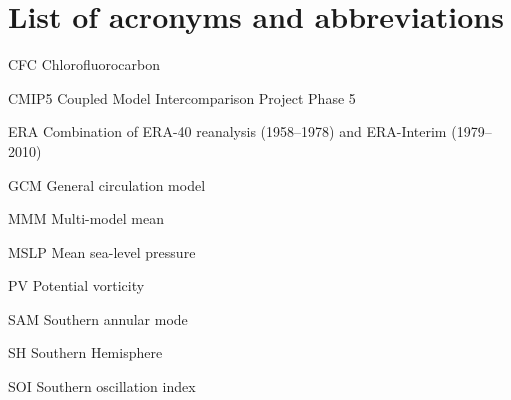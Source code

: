 \chapter*{List of acronyms and abbreviations}

\begin{description*}

\item[CFC] Chlorofluorocarbon
\item[CMIP5] Coupled Model Intercomparison Project Phase 5
\item[ERA] Combination of ERA-40 reanalysis (1958--1978) and ERA-Interim (1979--2010)
\item[GCM] General circulation model
\item[MMM] Multi-model mean
\item[MSLP] Mean sea-level pressure
\item[PV] Potential vorticity
\item[SAM] Southern annular mode
\item[SH] Southern Hemisphere
\item[SOI] Southern oscillation index

\end{description*}



